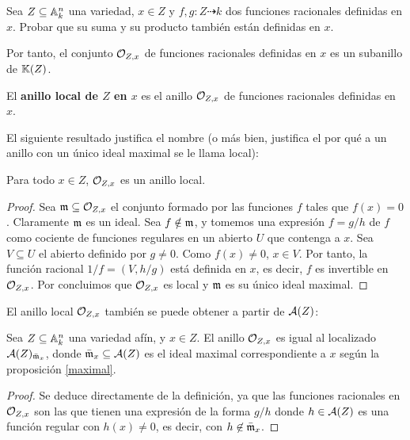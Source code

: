 \documentclass[ACGA.tex]{subfiles}
\begin{document}
\begin{ejer}\label{sumaproddefinida}
 Sea $Z\subseteq\mathbb{A}^n_k$ una variedad, $x\in Z$ y $f,g:Z\dashrightarrow k$ dos funciones racionales definidas en $x$. Probar que su suma y su producto también están definidas en $x$.
\end{ejer}

Por tanto, el conjunto ${\mathcal O}_{Z,x}$ de funciones racionales definidas en $x$ es un subanillo de $\mathbb{K}(Z)$.

\begin{defi}
 El {\bf anillo local de $Z$ en $x$} es el anillo ${\mathcal O}_{Z,x}$ de funciones racionales definidas en $x$.
\end{defi}

El siguiente resultado justifica el nombre (o más bien, justifica el por qué a un anillo con un único ideal maximal se le llama local):

\begin{prop}
 Para todo $x\in Z$, ${\mathcal O}_{Z,x}$ es un anillo local.
\end{prop}

\begin{proof}
 Sea ${\mathfrak{m}}\subseteq{\mathcal O}_{Z,x}$ el conjunto formado por las funciones $f$ tales que $f(x)=0$. Claramente ${\mathfrak{m}}$ es un ideal. Sea $f\notin{\mathfrak{m}}$, y tomemos una expresión $f=g/h$ de $f$ como cociente de funciones regulares en un abierto $U$ que contenga a $x$. Sea $V\subseteq U$ el abierto definido por $g\neq 0$. Como $f(x)\neq 0$, $x\in V$. Por tanto, la función racional $1/f=(V,h/g)$ está definida en $x$, es decir, $f$ es invertible en ${\mathcal O}_{Z,x}$. Por \cite[proposición 1.6]{am} concluimos que ${\mathcal O}_{Z,x}$ es local y ${\mathfrak{m}}$ es su único ideal maximal.
\end{proof}

El anillo local ${\mathcal O}_{Z,x}$ también se puede obtener a partir de $\mathcal{A}(Z)$:

\begin{prop}\label{anillolocal}
 Sea $Z\subseteq\mathbb{A}^n_k$ una variedad afín, y $x\in Z$. El anillo ${\mathcal O}_{Z,x}$ es igual al localizado $\mathcal{A}(Z)_{\bar{{\mathfrak{m}}}_x}$, donde $\bar{{\mathfrak{m}}}_x\subseteq\mathcal{A}(Z)$ es el ideal maximal correspondiente a $x$ según la proposición \ref{maximal}.
\end{prop}

\begin{proof}
 Se deduce directamente de la definición, ya que las funciones racionales en ${\mathcal O}_{Z,x}$ son las que tienen una expresión de la forma $g/h$ donde $h\in\mathcal{A}(Z)$ es una función regular con $h(x)\neq 0$, es decir, con $h\not\in \bar{{\mathfrak{m}}}_x$.
\end{proof}
\end{document}
